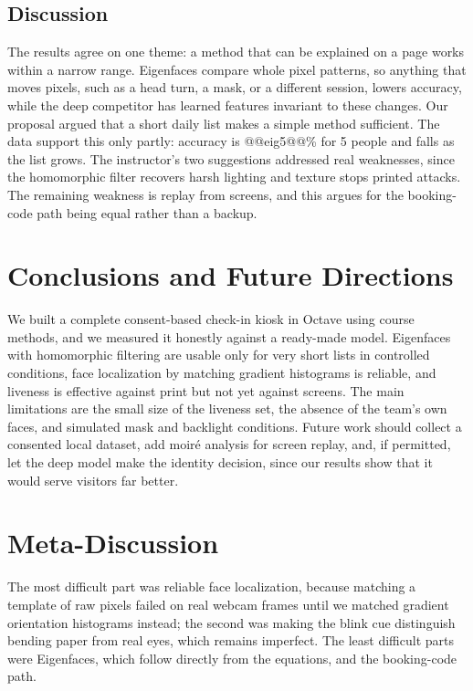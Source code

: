 \documentclass[conference,a4paper]{IEEEtran}
\begin{document}
\subsection{Discussion}
The results agree on one theme: a method that can be explained on a page works within a narrow range. Eigenfaces compare whole pixel patterns, so anything that moves pixels, such as a head turn, a mask, or a different session, lowers accuracy, while the deep competitor has learned features invariant to these changes. Our proposal argued that a short daily list makes a simple method sufficient. The data support this only partly: accuracy is @@eig5@@\% for 5 people and falls as the list grows. The instructor's two suggestions addressed real weaknesses, since the homomorphic filter recovers harsh lighting and texture stops printed attacks. The remaining weakness is replay from screens, and this argues for the booking-code path being equal rather than a backup.

\section{Conclusions and Future Directions}
We built a complete consent-based check-in kiosk in Octave using course methods, and we measured it honestly against a ready-made model. Eigenfaces with homomorphic filtering are usable only for very short lists in controlled conditions, face localization by matching gradient histograms is reliable, and liveness is effective against print but not yet against screens. The main limitations are the small size of the liveness set, the absence of the team's own faces, and simulated mask and backlight conditions. Future work should collect a consented local dataset, add moiré analysis for screen replay, and, if permitted, let the deep model make the identity decision, since our results show that it would serve visitors far better.

\section{Meta-Discussion}
The most difficult part was reliable face localization, because matching a template of raw pixels failed on real webcam frames until we matched gradient orientation histograms instead; the second was making the blink cue distinguish bending paper from real eyes, which remains imperfect. The least difficult parts were Eigenfaces, which follow directly from the equations, and the booking-code path.
\end{document}
